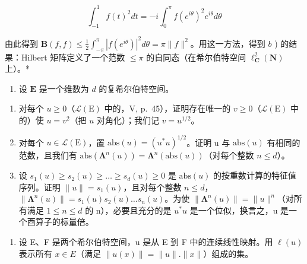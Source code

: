 \begin{enumerate}
\[
\int_ {- 1} ^ {1} f (t) ^ {2} d t = - i \int_ {0} ^ {\pi} f (e ^ {i \theta}) ^ {2} e ^ {i \theta} d \theta
\]

由此得到 \(\mathbf{B}(f, f) \leqslant \frac{1}{2} \int_{-\pi}^{\pi} |f(e^{i\theta})|^2 d\theta = \pi \| f\|^2\)。用这一方法，得到 \(b\) ) 的结果：Hilbert 矩阵定义了一个范数 \(\leqslant \pi\) 的自同态（在希尔伯特空间 \(\ell_{\mathbf{C}}^2(\mathbf{N})\) 上）。*

\begin{enumerate}
\def\labelenumi{\arabic{enumi})}
\setcounter{enumi}{3}
\tightlist
\item
  设 \(\mathbf{E}\) 是一个维数为 \(d\) 的复希尔伯特空间。
\end{enumerate}

\begin{enumerate}
\def\labelenumi{\alph{enumi})}
\item
  对每个 \(u \geqslant 0\)（\(\mathcal{L}(\mathrm{E})\) 中的，V, p.~45），证明存在唯一的 \(v \geqslant 0\)（\(\mathcal{L}(\mathrm{E})\) 中的）使 \(u = v^2\)（把 \(u\) 对角化）；我们记 \(v = u^{1/2}\)。
\item
  对每个 \(u \in \mathcal{L}(\mathrm{E})\)，置 \(\mathrm{abs}(u) = (u^{*}u)^{1/2}\)。证明 u 与 \(\mathrm{abs}(u)\) 有相同的范数，且我们有 \(\mathrm{abs}(\symbf{\Lambda}^{n}(u)) = \symbf{\Lambda}^{n}(\mathrm{abs}(u))\)（对每个整数 \(n \leqslant d\)）。
\item
  设 \(s_{1}(u) \geqslant s_{2}(u) \geqslant \ldots \geqslant s_{d}(u) \geqslant 0\) 是 \(\mathrm{abs}(u)\) 的按重数计算的特征值序列。证明 \(\|u\| = s_{1}(u)\)，且对每个整数 \(n \leqslant d\)，\(\| \symbf{\Lambda}^{n}(u)\| = s_{1}(u) s_{2}(u) \ldots s_{n}(u)\)。为使 \(\| \symbf{\Lambda}^{n}(u)\| = \| u\|^{n}\)（对所有满足 \(1 \leqslant n \leqslant d\) 的 n），必要且充分的是 \(u^{*}u\) 是一个位似，换言之，u 是一个酉算子的标量倍。
\end{enumerate}

\begin{enumerate}
\def\labelenumi{\arabic{enumi})}
\setcounter{enumi}{4}
\tightlist
\item
  设 E、F 是两个希尔伯特空间，u 是从 E 到 F 中的连续线性映射。用 \(\ell(u)\) 表示所有 \(x \in E\)（满足 \(\|u(x)\| = \|u\|. \|x\|\)）组成的集。
\end{enumerate}


\end{enumerate}
